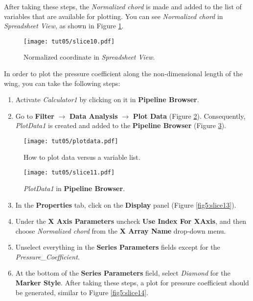 After taking these steps, the \textit{Normalized chord} is made and added to the list of variables that are available for plotting. You can see \textit{Normalized chord} in \textit{Spreadsheet View}, as shown in Figure \ref{fig5:slice10}.
\begin{figure}[ht]
    \centering
    \texttt{[image: tut05/slice10.pdf]}
    \caption{Normalized coordinate in \textit{Spreadsheet View}.}
    \label{fig5:slice10}
\end{figure}

In order to plot the pressure coefficient along the non-dimensional length of the wing, you can take the following steps:
\begin{enumerate}[label=\arabic*)]
	\setcounter{enumi}{0}
	\item Activate \textit{Calculator1} by clicking on it in \textbf{Pipeline Browser}.
	\item Go to \textbf{Filter} $\rightarrow$ \textbf{Data Analysis} $\rightarrow$ \textbf{Plot Data} (Figure \ref{fig5:plotdata5}). Consequently, \textit{PlotData1} is created and added to the \textbf{Pipeline Browser} (Figure \ref{fig5:slice11}).
\end{enumerate}
\begin{figure}[ht]
    \centering
    \texttt{[image: tut05/plotdata.pdf]}
    \caption{How to plot data versus a variable list.}
    \label{fig5:plotdata5}
\end{figure}
\begin{figure}[H]
    \centering
    \texttt{[image: tut05/slice11.pdf]}
    \caption{\textit{PlotData1} in \textbf{Pipeline Browser}.}
    \label{fig5:slice11}
\end{figure}
\begin{enumerate}[label=\arabic*)]
	\setcounter{enumi}{2}
	\item In the \textbf{Properties} tab, click on the \textbf{Display} panel (Figure \ref{fig5:slice13}).
	\item Under the \textbf{X Axis Parameters} uncheck \textbf{Use Index For XAxis}, and then choose \textit{Normalized chord} from the \textbf{X Array Name} drop-down menu.
	\item Unselect everything in the \textbf{Series Parameters} fields except for the \textit{Pressure\_Coefficient}.
	\item At the bottom of the \textbf{Series Parameters} field, select \textit{Diamond} for the \textbf{Marker Style}. After taking these steps, a plot for pressure coefficient should be generated, similar to Figure \ref{fig5:slice14}.
\end{enumerate}

